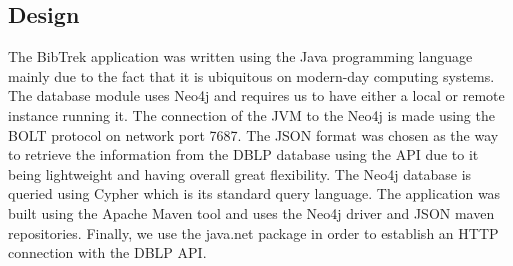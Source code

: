 \documentclass[twocolumn]{article}
\begin{document}
\subsection{Design}
The BibTrek application was written using the Java programming language mainly due to the fact that it is ubiquitous on modern-day computing systems. The database module uses Neo4j and requires us to have either a local or remote instance running it. The connection of the JVM to the Neo4j is made using the BOLT protocol on network port 7687. The JSON format was chosen as the way to retrieve the information from the DBLP database using the API due to it being lightweight and having overall great flexibility. The Neo4j database is queried using Cypher\cite{cypher} which is its standard query language. The application was built using the Apache Maven tool and uses the Neo4j driver and JSON maven repositories. Finally, we use the java.net package in order to establish an HTTP connection with the DBLP API.
\end{document}
